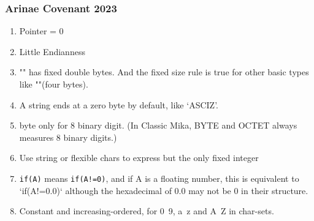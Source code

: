 
\subsubsection{Arinae Covenant 2023}

\begin{enumerate}
	\item Pointer  = 0
	\item Little Endianness
	\item "" has fixed double bytes. And the fixed size rule is true for other basic types like ""(four bytes).
	\item A string ends at a zero byte by default, like `ASCIZ'.
	\item byte only for 8 binary digit. (In Classic Mika, BYTE and OCTET always measures 8 binary digits.)
	\item Use string or flexible chars to express  but the only fixed integer
	\item \verb`if(A)` means \verb`if(A!=0)`, and if {A} is a floating number, this is equivalent to \textbf{}`if(A!=0.0)` although the hexadecimal of {0.0} may not be {0} in their structure.
	\item Constant and increasing-ordered, for 0~9, a~z and A~Z in char-sets. %
\end{enumerate}

